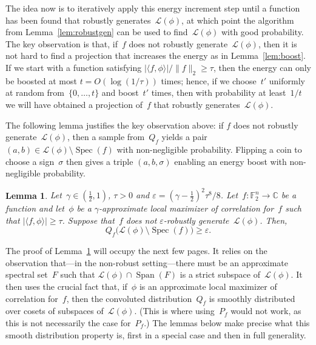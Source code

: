 \documentclass[11pt]{amsart}
\newcommand{\C}{\mathbb{C}} %
\newcommand{\F}{\mathbb{F}} %
\newcommand{\Lcal}{\mathcal{L}}
\DeclareMathOperator{\vspan}{Span} %
\newcommand{\eps}{\varepsilon}
\DeclareMathOperator{\spec}{Spec}
\theoremstyle{plain}
\newtheorem{lemma}[theorem]{Lemma}
\theoremstyle{definition}
\theoremstyle{remark}
\begin{document}
The idea now is to iteratively apply this energy increment step until a function has been found that robustly generates~$\mathcal L(\phi)$, at which point the algorithm from Lemma~\ref{lem:robustgen} can be used to find~$\mathcal L(\phi)$ with good probability.
The key observation is that, if~$f$ does not robustly generate~$\Lcal(\phi)$, then it is not hard to find a projection that increases the energy as in Lemma~\ref{lem:boost}.
If we start with a function satisfying $|\langle f, \phi\rangle|/\|f\|_2 \geq \tau$, then the energy can only be boosted at most $t= O(\log(1/\tau))$ times;
hence, if we choose~$t'$ uniformly at random from~$\{0,\dots,t\}$ and boost~$t'$ times, then with probability at least~$1/t$ we will have obtained a projection of~$f$ that robustly generates~$\mathcal L(\phi)$.

The following lemma justifies the key observation above:
if $f$ does not robustly generate~$\Lcal(\phi)$, then a sample from~$Q_f$ yields a pair $(a,b)\in \mathcal L(\phi)\setminus \spec(f)$ with non-negligible probability.
Flipping a coin to choose a sign~$\sigma$ then gives a triple $(a,b,\sigma)$ enabling an energy boost with non-negligible probability.

\begin{lemma} \label{lem:nonrobust}
    Let~$\gamma\in (\tfrac{1}{2}, 1)$, $\tau>0$ and  $\eps = (\gamma  -\frac{1}{2})^2\tau^8/8$.
    Let~$f:\F_2^n\to\C$ be a function and let~$\phi$ be a $\gamma$-approximate local maximizer of correlation for~$f$ such that $|\langle f, \phi\rangle| \geq \tau$.
    Suppose that~$f$ does not $\eps$-robustly generate~$\mathcal L(\phi)$.
    Then,
    \begin{equation*}
        Q_f\big(\mathcal L(\phi)\setminus \spec(f)\big) \geq \eps.
    \end{equation*}
\end{lemma}

The proof of Lemma~\ref{lem:nonrobust} will occupy the next few pages.
It relies on the observation that---in the non-robust setting---there must be an approximate spectral set~$F$ such that $\Lcal(\phi) \cap\vspan(F)$ is a strict subspace of~$\Lcal(\phi)$.
It then uses the crucial fact that, if~$\phi$ is an approximate local maximizer of correlation for~$f$, then the convoluted distribution~$Q_f$ is smoothly distributed over cosets of subspaces of~$\mathcal L(\phi)$.
(This is where using~$P_f$ would not work, as this is not necessarily the case for~$P_f$.)
The lemmas below make precise what this smooth distribution property is, first in a special case and then in full generality.
\end{document}
